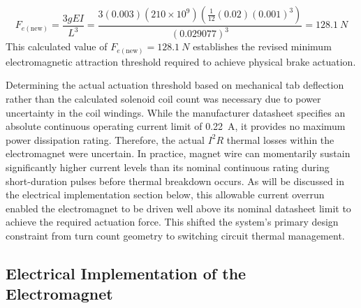 \begin{equation}
	\label{eq:jhbVG}
	F_{e(\text{new})} = \frac{3 g E I}{L^3} = \frac{3(0.003)(210 \times 10^9)\left(\frac{1}{12}(0.02)(0.001)^3\right)}{(0.029077)^3} = \SI{128.1}{N}
\end{equation}
This calculated value of $F_{e(\text{new})} = \SI{128.1}{N}$ establishes the revised minimum electromagnetic attraction threshold required to achieve physical brake actuation.

Determining the actual actuation threshold based on mechanical tab deflection rather than the calculated solenoid coil count was necessary due to power uncertainty in the coil windings. While the manufacturer datasheet specifies an absolute continuous operating current limit of \SI{0.22}{A}, it provides no maximum power dissipation rating. Therefore, the actual $I^2 R$ thermal losses within the electromagnet were uncertain. In practice, magnet wire can momentarily sustain significantly higher current levels than its nominal continuous rating during short-duration pulses before thermal breakdown occurs. As will be discussed in the electrical implementation section below, this allowable current overrun enabled the electromagnet to be driven well above its nominal datasheet limit to achieve the required actuation force. This shifted the system's primary design constraint from turn count geometry to switching circuit thermal management.

\subsection{Electrical Implementation of the Electromagnet}

